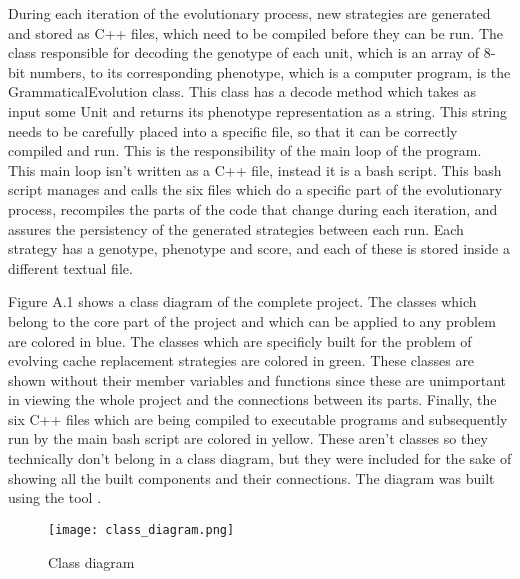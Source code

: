 During each iteration of the evolutionary process, new strategies are generated and stored as C++ files, which need to be compiled before they can be run. The class responsible for decoding the genotype of each unit, which is an array of 8-bit numbers, to its corresponding phenotype, which is a computer program, is the GrammaticalEvolution class. This class has a decode method which takes as input some Unit and returns its phenotype representation as a string. This string needs to be carefully placed into a specific file, so that it can be correctly compiled and run. This is the responsibility of the main loop of the program. This main loop isn't written as a C++ file, instead it is a bash script. This bash script manages and calls the six files which do a specific part of the evolutionary process, recompiles the parts of the code that change during each iteration, and assures the persistency of the generated strategies between each run. Each strategy has a genotype, phenotype and score, and each of these is stored inside a different textual file.

Figure A.1 shows a class diagram of the complete project. The classes which belong to the core part of the project and which can be applied to any problem are colored in blue. The classes which are specificly built for the problem of evolving cache replacement strategies are colored in green. These classes are shown without their member variables and functions since these are unimportant in viewing the whole project and the connections between its parts. Finally, the six C++ files which are being compiled to executable programs and subsequently run by the main bash script are colored in yellow. These aren't classes so they technically don't belong in a class diagram, but they were included for the sake of showing all the built components and their connections. The diagram was built using the tool \citep{diagrams}.

\begin{figure}[H]
	\centering
	\texttt{[image: class\_diagram.png]}
	\caption{Class diagram}
\end{figure}